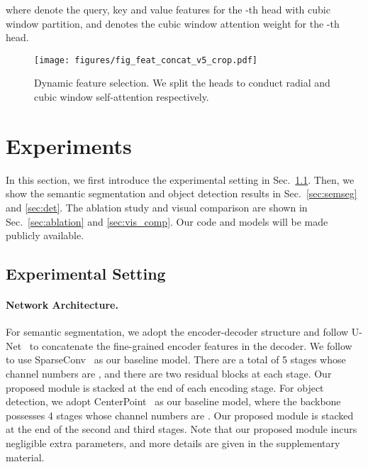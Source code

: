 \documentclass[10pt,twocolumn,letterpaper]{article}
\begin{document}
\noindent where  denote the query, key and value features for the -th head with cubic window partition, and  denotes the cubic window attention weight for the -th head.





\begin{figure}
\begin{center}
\texttt{[image: figures/fig\_feat\_concat\_v5\_crop.pdf]}
\end{center}
\vspace{-0.5cm}
\caption{Dynamic feature selection. We split the heads to conduct radial and cubic window self-attention respectively.}
\label{fig:feat_concat}
\vspace{-0.5cm}
\end{figure}

\section{Experiments}


In this section, we first introduce the experimental setting in Sec.~\ref{sec:exp_setting}. Then, we show the semantic segmentation and object detection results in Sec.~\ref{sec:semseg} and \ref{sec:det}. The ablation study and visual comparison are shown in Sec.~\ref{sec:ablation} and \ref{sec:vis_comp}. Our code and models will be made publicly available.

\subsection{Experimental Setting}
\label{sec:exp_setting}
\paragraph{Network Architecture.} For semantic segmentation, we adopt the encoder-decoder structure and follow U-Net~\cite{ronneberger2015u} to concatenate the fine-grained encoder features in the decoder. We follow \cite{zhu2021cylindrical} to use SparseConv~\cite{3DSemanticSegmentationWithSubmanifoldSparseConvNet,SubmanifoldSparseConvNet} as our baseline model. There are a total of 5 stages whose channel numbers are , and there are two residual blocks at each stage. Our proposed module is stacked at the end of each encoding stage. For object detection, we adopt CenterPoint~\cite{yin2021center} as our baseline model, where the backbone possesses 4 stages whose channel numbers are . Our proposed module is stacked at the end of the second and third stages. Note that our proposed module incurs negligible extra parameters, and more details are given in the supplementary material.
\end{document}
